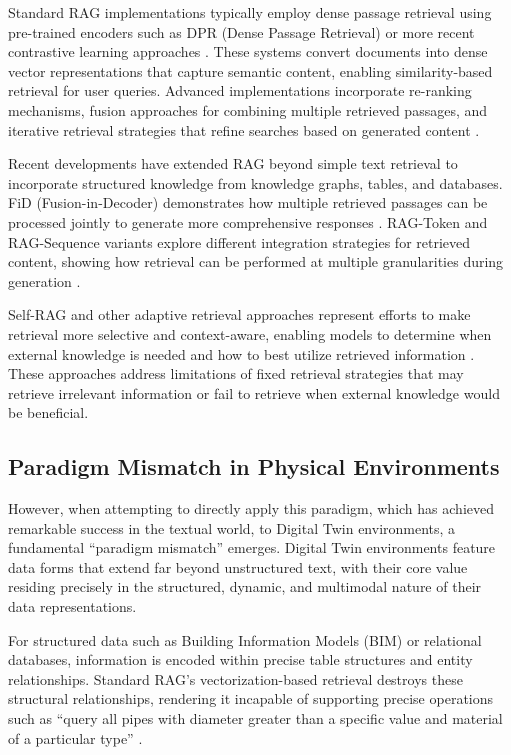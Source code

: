 Standard RAG implementations typically employ dense passage retrieval using pre-trained encoders such as DPR (Dense Passage Retrieval) or more recent contrastive learning approaches \cite{karpukhin2020dense, izacard2021leveraging}. These systems convert documents into dense vector representations that capture semantic content, enabling similarity-based retrieval for user queries. Advanced implementations incorporate re-ranking mechanisms, fusion approaches for combining multiple retrieved passages, and iterative retrieval strategies that refine searches based on generated content \cite{yu2022generate}.

Recent developments have extended RAG beyond simple text retrieval to incorporate structured knowledge from knowledge graphs, tables, and databases. FiD (Fusion-in-Decoder) demonstrates how multiple retrieved passages can be processed jointly to generate more comprehensive responses \cite{izacard2021leveraging}. RAG-Token and RAG-Sequence variants explore different integration strategies for retrieved content, showing how retrieval can be performed at multiple granularities during generation \cite{lewis2020retrieval}.

Self-RAG and other adaptive retrieval approaches represent efforts to make retrieval more selective and context-aware, enabling models to determine when external knowledge is needed and how to best utilize retrieved information \cite{asai2023self}. These approaches address limitations of fixed retrieval strategies that may retrieve irrelevant information or fail to retrieve when external knowledge would be beneficial.

\subsection{Paradigm Mismatch in Physical Environments}

However, when attempting to directly apply this paradigm, which has achieved remarkable success in the textual world, to Digital Twin environments, a fundamental ``paradigm mismatch'' emerges. Digital Twin environments feature data forms that extend far beyond unstructured text, with their core value residing precisely in the structured, dynamic, and multimodal nature of their data representations.

For structured data such as Building Information Models (BIM) or relational databases, information is encoded within precise table structures and entity relationships. Standard RAG's vectorization-based retrieval destroys these structural relationships, rendering it incapable of supporting precise operations such as ``query all pipes with diameter greater than a specific value and material of a particular type'' \cite{tang2019retrieving}.

